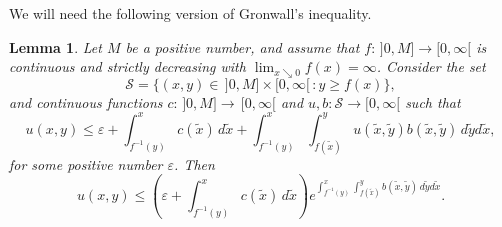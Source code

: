 \documentclass[a4paper,11pt,oneside,reqno]{amsart}
\newtheorem{Lem}[Thm]{Lemma}
\newcommand{\cal}{\mathcal}
\newcommand{\eps}{\varepsilon}
\begin{document}
We will need the following version of Gronwall's inequality.
\begin{Lem}\label{our_Gronwall3}
Let $M$ be a positive number, and
assume that $f:\,]0,M]\to[0,\infty[$ is continuous and strictly decreasing with $\lim_{x\searrow 0}f(x)=\infty$.
Consider the set $${\cal S}=\{(x,y)\in\,]0,M]\times[0,\infty[\,:y\geq f(x)\},$$
and continuous functions $c:\,]0,M]\to\,[0,\infty[$ and $u,b:{\cal S}\to[0,\infty[$ such that
\begin{equation}\label{eps}
u(x,y)\leq \eps+\int_{f^{-1}(y)}^xc(\tilde x)\,d\tilde x+\int_{f^{-1}(y)}^x\int_{f(\tilde x)}^yu(\tilde x,\tilde y)b(\tilde x,\tilde y)\,d\tilde yd\tilde x,
\end{equation}
for some positive number $\eps$.
Then
\begin{equation}\label{gronwall3}
u(x,y)\leq \left(\eps+\int_{f^{-1}(y)}^xc(\tilde x)\,d\tilde x\right)e^{\int_{f^{-1}(y)}^x\int_{f(\tilde x)}^yb(\tilde x,\tilde y)\,d\tilde yd\tilde x}.
\end{equation}
\end{Lem}
\end{document}
